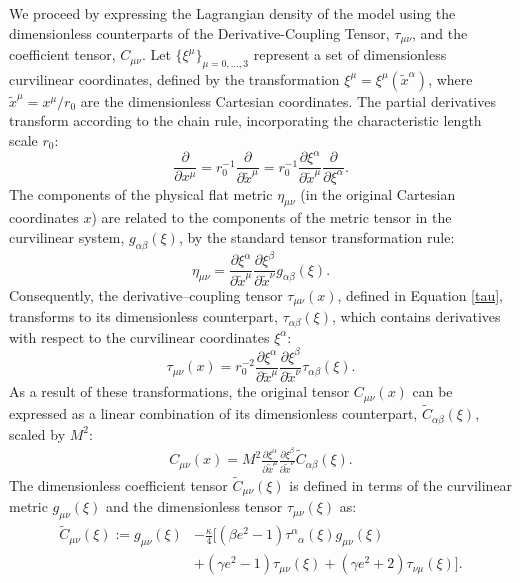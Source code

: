 \documentclass[aps,prd,superscriptaddress,notitlepage,11pt,final,longbibliography,nofootinbib]{revtex4-1}
\newcommand{\be}{\begin{equation}}
\newcommand{\ee}{\end{equation}}
\numberwithin{equation}{section}
\begin{document}
We proceed by expressing the Lagrangian density of the model using the dimensionless counterparts of the Derivative-Coupling Tensor, $\tau_{\mu\nu}$, and the coefficient tensor, $C_{\mu\nu}$. Let $\{\xi^{\mu}\}_{\mu=0,\ldots,3}$ represent a set of dimensionless curvilinear coordinates, defined by the transformation $\xi^{\mu}=\xi^{\mu}(\tilde{x}^{\alpha})$, where $\tilde{x}^{\mu} = x^{\mu}/r_0$ are the dimensionless Cartesian coordinates. The partial derivatives transform according to the chain rule, incorporating the characteristic length scale $r_0$:
\be
\frac{\partial}{\partial x^{\mu}}=r_0^{-1}\frac{\partial}{\partial \tilde x^{\mu}}=r_0^{-1}\frac{\partial\xi^{\alpha}}{\partial \tilde x^{\mu}}\frac{\partial}{\partial  \xi^{\alpha}}.
\ee
The components of the physical flat metric $\eta_{\mu\nu}$ (in the original Cartesian coordinates $x$) are related to the components of the metric tensor in the curvilinear system, $g_{\alpha\beta}(\xi)$, by the standard tensor transformation rule:
\be
\eta_{\mu\nu}=\frac{\partial\xi^{\alpha}}{\partial \tilde x^{\mu}}\frac{\partial\xi^{\beta}}{\partial \tilde x^{\nu}}g_{\alpha\beta}(\xi).\nonumber
\ee
Consequently, the derivative--coupling tensor $\tau_{\mu\nu}(x)$, defined in Equation \eqref{tau}, transforms to its dimensionless counterpart, $\tau_{\alpha\beta}(\xi)$, which contains derivatives with respect to the curvilinear coordinates $\xi^{\alpha}$: 
\be
\tau_{\mu\nu}(x)=r_0^{-2}\frac{\partial\xi^{\alpha}}{\partial \tilde x^{\mu}}\frac{\partial\xi^{\beta}}{\partial \tilde x^{\nu}}\tau_{\alpha\beta}(\xi).\nonumber
\ee
As a result of these transformations, the original tensor $C_{\mu\nu}(x)$ can be expressed as a linear combination of its dimensionless counterpart, $\widetilde{C}_{\alpha\beta}(\xi)$, scaled by $M^2$:
\begin{align*}
C_{\mu\nu}(x)=M^2\frac{\partial\xi^{\alpha}}{\partial \tilde x^{\mu}}\frac{\partial\xi^{\beta}}{\partial \tilde x^{\nu}}\tilde C_{\alpha\beta}(\xi).
\end{align*}
The dimensionless coefficient tensor $\widetilde{C}_{\mu\nu}(\xi)$ is defined in terms of the curvilinear metric $g_{\mu\nu}(\xi)$ and the dimensionless tensor $\tau_{\mu\nu}(\xi)$ as:
\begin{align}
\widetilde C_{\mu\nu}(\xi):=g_{\mu\nu}(\xi)&-\frac{\kappa}{4}\Big[(\beta e^2-1)\tau^{\alpha}_{\,\,\,\,\alpha}(\xi)g_{\mu\nu}(\xi)\nonumber\\&+(\gamma e^2-1)\tau_{\mu\nu}(\xi)+(\gamma e^2+2)\tau_{\nu\mu}(\xi)\Big].\label{Cxi}
\end{align}
\end{document}
